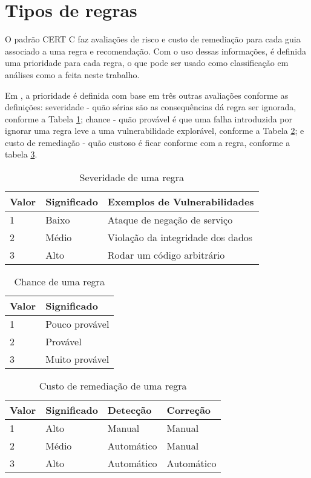 \section{Tipos de regras}

O padrão CERT C faz avaliações de risco e custo de remediação para cada guia associado a uma regra e recomendação. Com o uso dessas informações, é definida uma prioridade para cada regra, o que pode ser usado como classificação em análises como a feita neste trabalho.

Em \cite{ccert}, a prioridade é definida com base em três outras avaliações conforme as definições: severidade - quão sérias são as consequências dá regra ser ignorada, conforme a Tabela \ref{table:severidade}; chance - quão provável é que uma falha introduzida por ignorar uma regra leve a uma vulnerabilidade explorável, conforme a Tabela \ref{table:chance}; e custo de remediação - quão custoso é ficar conforme com a regra, conforme a tabela \ref{table:remediacao}.

\begin{table}[!h]
  \begin{tabular}{l|l|l}
    Valor & Significado & Exemplos de Vulnerabilidades \\\hline
    1 & Baixo & Ataque de negação de serviço\\
    2 & Médio & Violação da integridade dos dados\\
    3 & Alto & Rodar um código arbitrário\\
  \end{tabular}
  \caption{Severidade de uma regra}
  \label{table:severidade}
\end{table}

\begin{table}[!h]
  \begin{tabular}{l|l}
    Valor & Significado \\\hline
    1 & Pouco provável\\
    2 & Provável\\
    3 & Muito provável\\
  \end{tabular}
  \caption{Chance de uma regra}
  \label{table:chance}
\end{table}

\begin{table}[!h]
  \begin{tabular}{l|l|l|l}
    Valor & Significado & Detecção & Correção \\\hline
    1 & Alto & Manual & Manual \\
    2 & Médio & Automático & Manual \\
    3 & Alto & Automático & Automático \\
  \end{tabular}
  \caption{Custo de remediação de uma regra}
  \label{table:remediacao}
\end{table}


